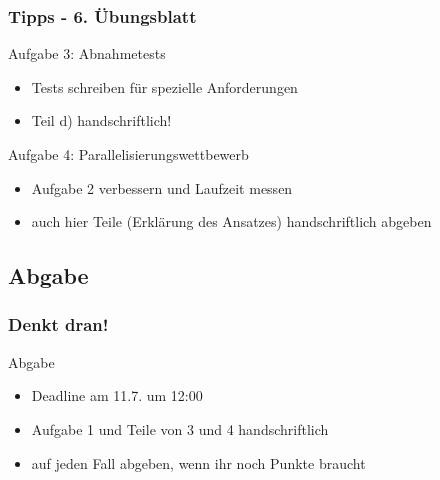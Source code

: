 \documentclass[18pt]{beamer}
\begin{document}
	\begin{frame}
		\frametitle{Tipps - 6. Übungsblatt}
		\begin{exampleblock}{Aufgabe 3: Abnahmetests}
			\begin{itemize}
				\item Tests schreiben für spezielle Anforderungen
				\item Teil d) handschriftlich!
			\end{itemize}
		\end{exampleblock}
		\pause
		\begin{exampleblock}{Aufgabe 4: Parallelisierungswettbewerb}
			\begin{itemize}
				\item Aufgabe 2 verbessern und Laufzeit messen
				\item auch hier Teile (Erklärung des Ansatzes) handschriftlich abgeben
			\end{itemize}
		\end{exampleblock}
	\end{frame}

	\subsection{Abgabe}
	\begin{frame}
		\frametitle{Denkt dran!}
		\begin{alertblock}{Abgabe}
			\begin{itemize}
				\item Deadline am 11.7. um 12:00
				\item Aufgabe 1 und Teile von 3 und 4 handschriftlich
				\item auf jeden Fall abgeben, wenn ihr noch Punkte braucht
			\end{itemize}
		\end{alertblock}
	\end{frame}
\end{document}
